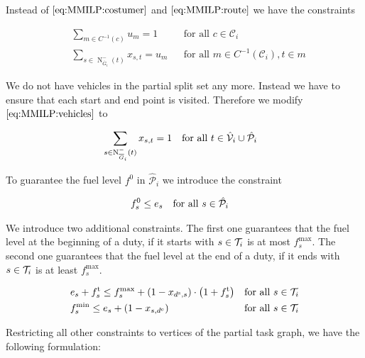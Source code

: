 Instead of $\eqref{eq:MMILP:costumer}$ and $\eqref{eq:MMILP:route}$ we have the constraints

\begin{align}
	& \sum_{m\in C^{-1}(c)} u_m = 1 && \text{for all } c\in\mathcal{C}_i \label{eq:CMILP:costumer} \\
	&\sum_{s\in\operatorname{N}_{\overline{G}_i}^-(t)} x_{s,t} = u_m && \text{for all } m\in C^{-1}\left(\mathcal{C}_i\right), t\in m \label{eq:CMILP:route}
\end{align}

We do not have vehicles in the partial split set any more. Instead we have to ensure that each start and end point is visited. Therefore we modify $\eqref{eq:MMILP:vehicles}$ to 

\begin{align}
	& \sum_{s\in\operatorname{N}_{\overline{G}_i}^-(t)} x_{s,t} = 1 && \text{for all } t\in\hat{\mathcal{V}}_i\cup\hat{\mathcal{P}}_i \label{eq:CMILP:start_end_points}
\end{align}

To guarantee the fuel level $f^0$ in $\hat{\mathcal{P}}_i$ we introduce the constraint

\begin{align}
	& f^0_s \leq e_s && \text{for all } s\in\hat{\mathcal{P}}_i \label{eq:CMILP:final_fuel}
\end{align}

We introduce two additional constraints. The first one guarantees that the fuel level at the beginning of a duty, if it starts with $s\in\mathcal{T}_i$ is at most $f_s^{\max}$. The second one guarantees that the fuel level at the end of a duty, if it ends with $s\in\mathcal{T}_i$ is at least $f_s^{\max}$.

\begin{align}
	& e_s + f^{\operatorname{t}}_s \leq f^{\max}_s + \left(1-x_{d^{\operatorname{s}},s}\right)\cdot\left(1+f^{\operatorname{t}}_s\right) && \text{for all } s\in\mathcal{T}_i \label{eq:CMILP:fmax} \\
	& f^{\min}_s \leq e_s + \left(1-x_{s,d^{\operatorname{e}}}\right) && \text{for all } s\in\mathcal{T}_i \label{eq:CMILP:fmin}
\end{align}

Restricting all other constraints to vertices of the partial task graph, we have the following formulation:

